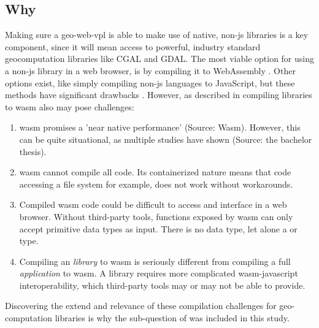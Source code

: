 \subsection*{Why}

Making sure a \ac{geo-web-vpl} is able to make use of native, non-js libraries is a key component, since it will mean access to powerful, industry standard geocomputation libraries like CGAL and GDAL. 
The most viable option for using a non-js library in a web browser, is by compiling it to WebAssembly \cite{haas_bringing_2017}.
Other options exist, like simply compiling non-js languages to JavaScript, but these methods have significant drawbacks \cite{haas_bringing_2017,jangda_not_2019}.
However, as described in  compiling libraries to \ac{wasm} also may pose challenges:


\begin{enumerate}[-]
  \item \ac{wasm} promises a 'near native performance' (Source: Wasm). However, this can be quite situational, as multiple studies have shown \cite{jangda_not_2019} (Source: the bachelor thesis). 
  \item \ac{wasm} cannot compile all code. Its containerized nature means that code accessing a file system for example, does not work without workarounds. 
  \item Compiled \ac{wasm} code could be difficult to access and interface in a web browser. Without third-party tools, functions exposed by \ac{wasm} can only accept primitive data types as input. There is no  data type, let alone a  or  type. 
  \item Compiling an \emph{library} to \ac{wasm} is seriously different from compiling a full \emph{application} to wasm. A library requires more complicated wasm-javascript interoperability, which third-party tools may or may not be able to provide.
\end{enumerate}
Discovering the extend and relevance of these compilation challenges for geo-computation libraries is why the sub-question of \mySubRQTwoTitle \space was included in this study. 

